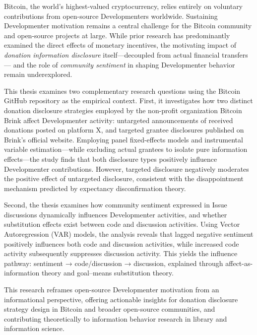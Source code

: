 \documentclass[
    type = master, %
    degree = professional,        %
    decl-page,  %
    twoside,                %
    fontset = fandol %
  ]{njuthesis}
\begin{document}
\begin{abstract*}
Bitcoin, the world's highest-valued cryptocurrency, relies entirely on voluntary contributions
from open-source Developmenters worldwide. Sustaining Developmenter motivation remains a central
challenge for the Bitcoin community and open-source projects at large. While prior research
has predominantly examined the direct effects of monetary incentives, the motivating impact
of \textit{donation information disclosure} itself—decoupled from actual financial transfers—
and the role of \textit{community sentiment} in shaping Developmenter behavior remain underexplored.

This thesis examines two complementary research questions using the Bitcoin GitHub repository
as the empirical context. First, it investigates how two distinct donation disclosure
strategies employed by the non-profit organization Bitcoin Brink affect Developmenter activity:
untargeted announcements of received donations posted on platform X, and targeted
grantee disclosures published on Brink's official website. Employing panel fixed-effects
models and instrumental variable estimation—while excluding actual grantees to isolate
pure information effects—the study finds that both disclosure types positively influence
Developmenter contributions. However, targeted disclosure negatively moderates the positive
effect of untargeted disclosure, consistent with the disappointment mechanism predicted
by expectancy disconfirmation theory.

Second, the thesis examines how community sentiment expressed in Issue discussions
dynamically influences Developmenter activities, and whether substitution effects exist between
code and discussion activities. Using Vector Autoregression (VAR) models, the analysis
reveals that lagged negative sentiment positively influences both code and discussion
activities, while increased code activity subsequently suppresses discussion activity.
This yields the influence pathway: sentiment → code/discussion → discussion, explained
through affect-as-information theory and goal–means substitution theory.

This research reframes open-source Developmenter motivation from an informational perspective,
offering actionable insights for donation disclosure strategy design in Bitcoin and
broader open-source communities, and contributing theoretically to information behavior
research in library and information science.
\end{abstract*}
\end{document}
